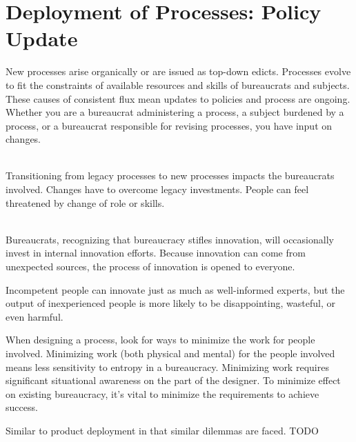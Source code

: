 \section{Deployment of Processes: Policy Update\label{sec:deployment-of-processes}}

New processes arise organically or are issued as top-down edicts. Processes evolve to fit the constraints of available resources and skills of bureaucrats and subjects. These causes of consistent flux mean updates to policies and process are ongoing. Whether you are a bureaucrat administering a process, a subject burdened by a process, or a bureaucrat responsible for revising processes, you have input on changes.

\ \\

Transitioning from legacy processes to new processes impacts the bureaucrats involved. Changes have to overcome legacy investments. People can feel threatened by change of role or skills.  

\ \\

Bureaucrats, recognizing that bureaucracy stifles innovation, will occasionally invest in internal innovation efforts. Because innovation can come from unexpected sources, the process of innovation is opened to everyone. 

Incompetent people can innovate just as much as well-informed experts, but the output of inexperienced people is more likely to be disappointing, wasteful, or even harmful. 



When designing a process, look for ways to minimize the work for people involved. Minimizing work (both physical and mental) for the people involved means less sensitivity to entropy in a bureaucracy. Minimizing work requires significant situational awareness on the part of the designer. To minimize effect on existing bureaucracy, it's vital to minimize the requirements to achieve success.


Similar to product deployment in that similar dilemmas are faced.
TODO

